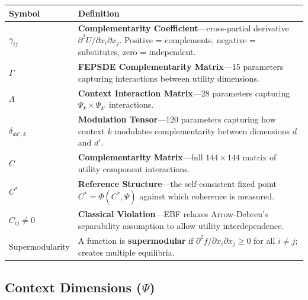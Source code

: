 \begin{longtable}{@{}p{2.8cm}p{10cm}@{}}
\toprule
\textbf{Symbol} & \textbf{Definition} \\
\midrule
\endhead
$\gamma_{ij}$ & \textbf{Complementarity Coefficient}---cross-partial derivative $\partial^2 U / \partial x_i \partial x_j$. Positive = complements, negative = substitutes, zero = independent. \\[6pt]
$\Gamma$ & \textbf{FEPSDE Complementarity Matrix}---15 parameters capturing interactions between utility dimensions. \\[6pt]
$\Lambda$ & \textbf{Context Interaction Matrix}---28 parameters capturing $\Psi_k \times \Psi_{k'}$ interactions. \\[6pt]
$\delta_{dd',k}$ & \textbf{Modulation Tensor}---120 parameters capturing how context $k$ modulates complementarity between dimensions $d$ and $d'$. \\[6pt]
$C$ & \textbf{Complementarity Matrix}---full $144 \times 144$ matrix of utility component interactions. \\[6pt]
$C^*$ & \textbf{Reference Structure}---the self-consistent fixed point $C^* = \Phi(C^*, \Psi)$ against which coherence is measured. \\[6pt]
$C_{ij} \neq 0$ & \textbf{Classical Violation}---EBF relaxes Arrow-Debreu's separability assumption to allow utility interdependence. \\[6pt]
Supermodularity & A function is \textbf{supermodular} if $\partial^2 f / \partial x_i \partial x_j \geq 0$ for all $i \neq j$; creates multiple equilibria. \\
\bottomrule
\end{longtable}

\subsection{Context Dimensions ($\Psi$)}

